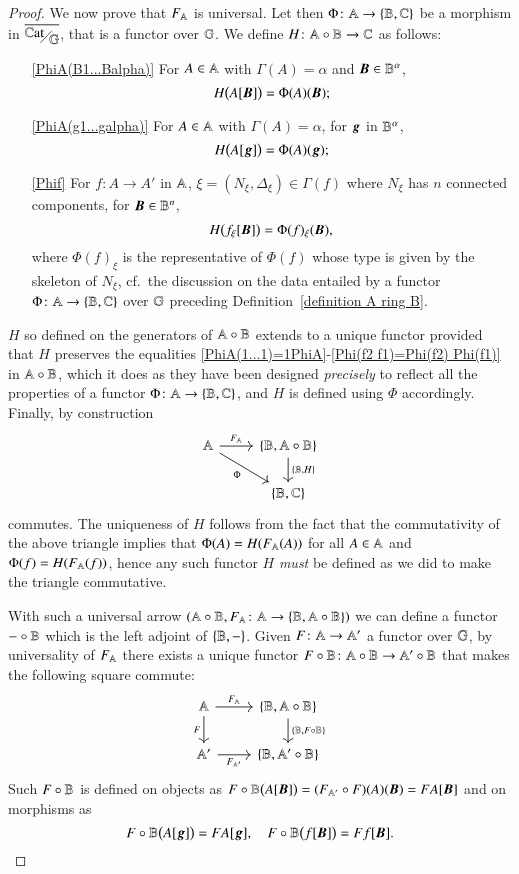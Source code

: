 \begin{proof}
    We now prove that $F_\mathbb A$ is universal. Let then $\Phi \colon \mathbb A \to \{ \mathbb B,\mathbb C\}$ be a morphism in $\WCFover\gcf$, that is a functor over $\mathbb G$. We define $H \colon \mathbb A \circ \mathbb B \to \mathbb C$ as follows:
    \begin{itemize}[wide=0pt,leftmargin=*]
        \item[\ref{PhiA(B1...Balpha)}] For $A \in \mathbb A$ with $\Gamma(A)=\alpha$ and ${\boldsymbol B} \in \mathbb B^\alpha$, 
        \[
        H\bigl(A[{\boldsymbol B}]\bigr) = \Phi(A)({\boldsymbol B});
        \]
        \item[\ref{PhiA(g1...galpha)}] For $A \in \mathbb A$ with $\Gamma(A)=\alpha$, for ${\boldsymbol g}$ in $\mathbb B^\alpha$, 
        \[
        H\bigl(A[{\boldsymbol g}]\bigr) = \Phi(A)({\boldsymbol g});
        \]
        \item[\ref{Phif}] For $f \colon A \to A'$ in $\mathbb A$, $\xi = (N_\xi,\Delta_\xi) \in \Gamma(f)$ where $N_\xi$ has $n$ connected components, for ${\boldsymbol B} \in \mathbb B^n$,
        \[
        H\bigl(f_\xi[{\boldsymbol B}]\bigr) = \Phi(f)_\xi({\boldsymbol B}),
        \]
        where $\Phi(f)_\xi$ is the representative of $\Phi(f)$ whose type is given by the skeleton of $N_\xi$, cf.~the discussion on the data entailed by a functor $\Phi \colon \mathbb A \to \{ \mathbb B,\mathbb C\}$ over $\mathbb G$ preceding Definition~\ref{definition A ring B}.
    \end{itemize}
    $H$ so defined on the generators of $\mathbb A \circ \mathbb B$ extends to a unique functor provided that $H$ preserves the equalities \ref{PhiA(1...1)=1PhiA}-\ref{Phi(f2 f1)=Phi(f2) Phi(f1)} in $\mathbb A \circ \mathbb B$, which it does as they have been designed \emph{precisely} to reflect all the properties of a functor $\Phi \colon \mathbb A \to \{ \mathbb B,\mathbb C\}$, and $H$ is defined using $\Phi$ accordingly. Finally, by construction 
    \[
    \begin{tikzcd}
    \A \ar[r,"F_\A"] \ar[dr,"\Phi"'] & \FC \B {\ring \A \B} \ar[d,"{\FC \B H}"] \\
    & \FC \B \C 
    \end{tikzcd}
    \]
    commutes. The uniqueness of $H$ follows from the fact that the commutativity of the above triangle implies that $\Phi(A)=H(F_\mathbb A(A))$ for all $A \in \mathbb A$ and $\Phi(f)=H(F_\mathbb A(f))$, hence any such functor $H$ \emph{must} be defined as we did to make the triangle commutative. 
    
    With such a universal arrow $(\mathbb A \circ \mathbb B, F_\mathbb A \colon \mathbb A \to \{ \mathbb B,\mathbb A \circ \mathbb B\})$ we can define a functor $- \circ \mathbb B$ which is the left adjoint of $\{ \mathbb B,-\}$. Given $F \colon \mathbb A \to \mathbb A'$ a functor over $\mathbb G$, by universality of $F_\mathbb A$ there exists a unique functor $F \circ \mathbb B \colon \mathbb A \circ \mathbb B \to \mathbb A' \circ \mathbb B$ that makes the following square commute:
    \[
    \begin{tikzcd}
    \A \ar[r,"F_\A"] \ar[d,"F"'] & \FC \B {\ring \A \B} \ar[d,"\FC \B {\ring F \B}"] \\
    \A' \ar[r,"F_{\A'}"'] & \FC \B {\ring {\A'} \B}
    \end{tikzcd}
    \]
    Such $F \circ \mathbb B$ is defined on objects as $F \circ \mathbb B \bigl( A[{\boldsymbol B}] \bigr) = (F_{\mathbb A'} \circ F)(A)({\boldsymbol B}) = FA[{\boldsymbol B}]$ and on morphisms as
    \[
    F \circ \mathbb B \bigl( A[{\boldsymbol g}] \bigr) = FA[{\boldsymbol g}], \quad 
    F \circ \mathbb B \bigl( f[{\boldsymbol B}] \bigr) = Ff[{\boldsymbol B}].
    \]
    

\end{proof}
